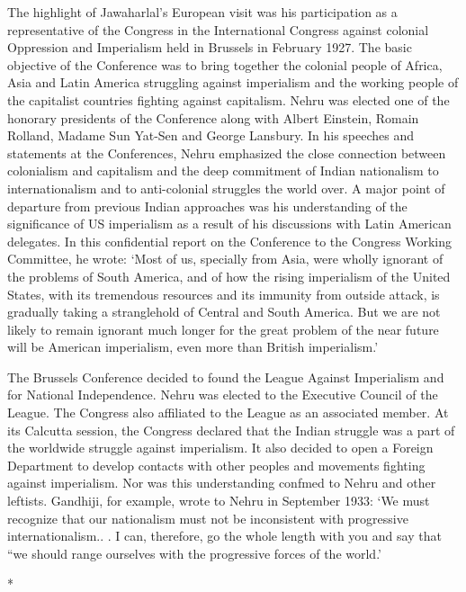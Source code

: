 \begin{multicols}{2}
The highlight of Jawaharlal's European visit was his participation as a representative of the Congress in the International Congress against colonial Oppression and Imperialism held in Brussels in February 1927. The basic objective of the Conference was to bring together the colonial people of Africa, Asia and Latin America struggling against imperialism and the working people of the capitalist countries fighting against capitalism. Nehru was elected one of the honorary presidents of the Conference along with Albert Einstein, Romain Rolland, Madame Sun Yat-Sen and George Lansbury. In his speeches and statements at the Conferences, Nehru emphasized the close connection between colonialism and capitalism and the deep commitment of Indian nationalism to internationalism and to anti-colonial struggles the world over. A major point of departure from previous Indian approaches was his understanding of the significance of US imperialism as a result of his discussions with Latin American delegates. In this confidential report on the Conference to the Congress Working Committee, he wrote: `Most of us, specially from Asia, were wholly ignorant of the problems of South America, and of how the rising imperialism of the United States, with its tremendous resources and its immunity from outside attack, is gradually taking a stranglehold of Central and South America. But we are not likely to remain ignorant much longer for the great problem of the near future will be American imperialism, even more than British imperialism.' 

The Brussels Conference decided to found the League Against Imperialism and for National Independence. Nehru was elected to the Executive Council of the League. The Congress also affiliated to the League as an associated member. At its Calcutta session, the Congress declared that the Indian struggle was a part of the worldwide struggle against imperialism. It also decided to open a Foreign Department to develop contacts with other peoples and movements fighting against imperialism. Nor was this understanding confmed to Nehru and other leftists. Gandhiji, for example, wrote to Nehru in September 1933: `We must recognize that our nationalism must not be inconsistent with progressive internationalism.. . I can, therefore, go the whole length with you and say that ``we should range ourselves with the progressive forces of the world.'

\begin{center}*\end{center}


\end{multicols}

